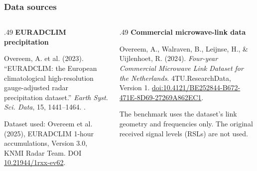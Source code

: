 \documentclass[aspectratio=169]{beamer}
\newcommand{\slidetitle}[1]{\frametitle{#1}}
\begin{document}
\begin{frame}[t]
\slidetitle{Data sources}
\begin{columns}[T,onlytextwidth]
\begin{column}{.49\textwidth}
\textbf{EURADCLIM precipitation}\par\smallskip
\small
Overeem, A. et al. (2023). “EURADCLIM: the European climatological high-resolution gauge-adjusted radar precipitation dataset.” \emph{Earth Syst. Sci. Data}, 15, 1441--1464. .\par\medskip
Dataset used: Overeem et al. (2025), EURADCLIM 1-hour accumulations, Version 3.0, KNMI Radar Team. DOI \href{https://doi.org/10.21944/1rxx-ev62}{10.21944/1rxx-ev62}.
\end{column}
\begin{column}{.49\textwidth}
\textbf{Commercial microwave-link data}\par\smallskip
\small
Overeem, A., Walraven, B., Leijnse, H., \& Uijlenhoet, R. (2024). \emph{Four-year Commercial Microwave Link Dataset for the Netherlands}. 4TU.ResearchData, Version 1. \href{https://doi.org/10.4121/BE252844-B672-471E-8D69-27269A862EC1}{doi:10.4121/BE252844-B672-471E-8D69-27269A862EC1}.\par\medskip
The benchmark uses the dataset's link geometry and frequencies only. The original received signal levels (RSLs) are not used.
\end{column}
\end{columns}
\end{frame}
\end{document}
